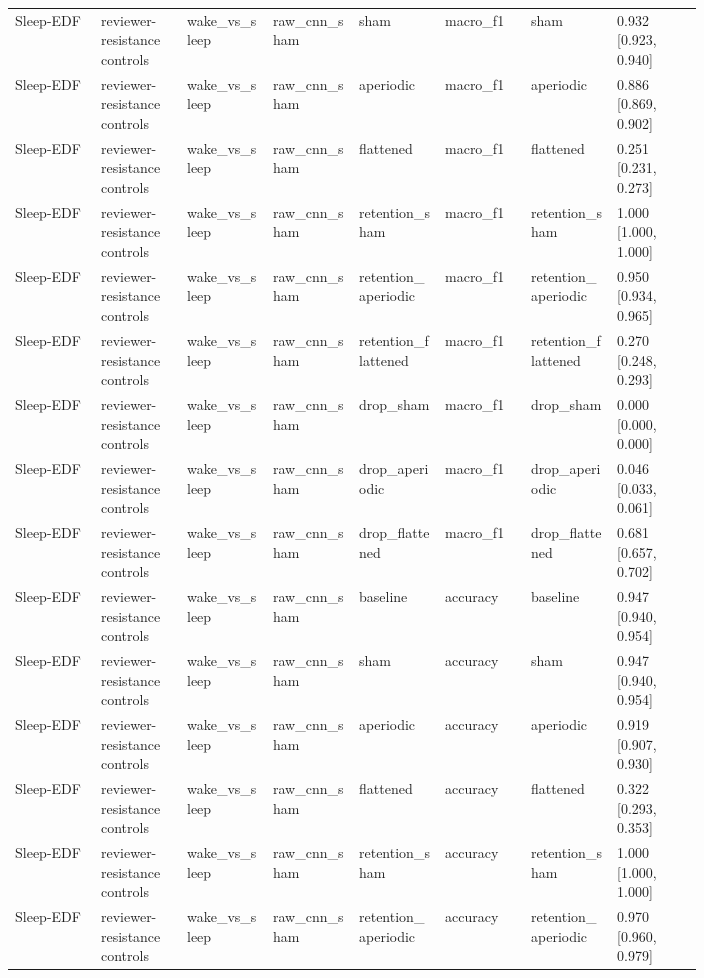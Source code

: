 \begin{longtable}{p{0.10\linewidth}p{0.10\linewidth}p{0.10\linewidth}p{0.10\linewidth}p{0.10\linewidth}p{0.10\linewidth}p{0.10\linewidth}p{0.10\linewidth}}
Sleep-EDF & reviewer-resistance controls & wake\_vs\_sleep & raw\_cnn\_sham & sham & macro\_f1 & sham & 0.932 [0.923, 0.940]\\
Sleep-EDF & reviewer-resistance controls & wake\_vs\_sleep & raw\_cnn\_sham & aperiodic & macro\_f1 & aperiodic & 0.886 [0.869, 0.902]\\
Sleep-EDF & reviewer-resistance controls & wake\_vs\_sleep & raw\_cnn\_sham & flattened & macro\_f1 & flattened & 0.251 [0.231, 0.273]\\
Sleep-EDF & reviewer-resistance controls & wake\_vs\_sleep & raw\_cnn\_sham & retention\_sham & macro\_f1 & retention\_sham & 1.000 [1.000, 1.000]\\
Sleep-EDF & reviewer-resistance controls & wake\_vs\_sleep & raw\_cnn\_sham & retention\_aperiodic & macro\_f1 & retention\_aperiodic & 0.950 [0.934, 0.965]\\
Sleep-EDF & reviewer-resistance controls & wake\_vs\_sleep & raw\_cnn\_sham & retention\_flattened & macro\_f1 & retention\_flattened & 0.270 [0.248, 0.293]\\
Sleep-EDF & reviewer-resistance controls & wake\_vs\_sleep & raw\_cnn\_sham & drop\_sham & macro\_f1 & drop\_sham & 0.000 [0.000, 0.000]\\
Sleep-EDF & reviewer-resistance controls & wake\_vs\_sleep & raw\_cnn\_sham & drop\_aperiodic & macro\_f1 & drop\_aperiodic & 0.046 [0.033, 0.061]\\
Sleep-EDF & reviewer-resistance controls & wake\_vs\_sleep & raw\_cnn\_sham & drop\_flattened & macro\_f1 & drop\_flattened & 0.681 [0.657, 0.702]\\
Sleep-EDF & reviewer-resistance controls & wake\_vs\_sleep & raw\_cnn\_sham & baseline & accuracy & baseline & 0.947 [0.940, 0.954]\\
Sleep-EDF & reviewer-resistance controls & wake\_vs\_sleep & raw\_cnn\_sham & sham & accuracy & sham & 0.947 [0.940, 0.954]\\
Sleep-EDF & reviewer-resistance controls & wake\_vs\_sleep & raw\_cnn\_sham & aperiodic & accuracy & aperiodic & 0.919 [0.907, 0.930]\\
Sleep-EDF & reviewer-resistance controls & wake\_vs\_sleep & raw\_cnn\_sham & flattened & accuracy & flattened & 0.322 [0.293, 0.353]\\
Sleep-EDF & reviewer-resistance controls & wake\_vs\_sleep & raw\_cnn\_sham & retention\_sham & accuracy & retention\_sham & 1.000 [1.000, 1.000]\\
Sleep-EDF & reviewer-resistance controls & wake\_vs\_sleep & raw\_cnn\_sham & retention\_aperiodic & accuracy & retention\_aperiodic & 0.970 [0.960, 0.979]\\

\end{longtable}
